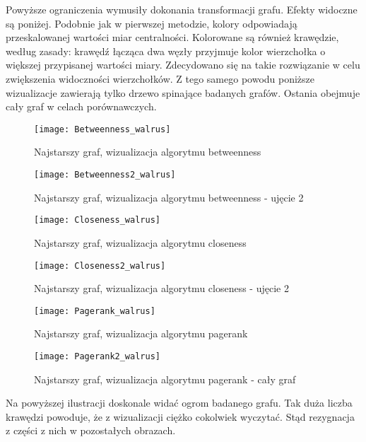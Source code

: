 Powyższe ograniczenia wymusiły dokonania transformacji grafu. Efekty widoczne są poniżej. Podobnie jak w pierwszej metodzie, kolory odpowiadają przeskalowanej wartości miar centralności. Kolorowane są również krawędzie, według zasady: krawędź łącząca dwa węzły przyjmuje kolor wierzchołka o większej przypisanej wartości miary. Zdecydowano się na takie rozwiązanie w celu zwiększenia widoczności wierzchołków. Z tego samego powodu poniższe wizualizacje zawierają tylko drzewo spinające badanych grafów. Ostania obejmuje cały graf w celach porównawczych. 

\FloatBarrier\FloatBarrier
\begin{figure}[h]
	\centering
	\texttt{[image: Betweenness\_walrus]}
	\caption{Najstarszy graf, wizualizacja algorytmu betweenness}
\end{figure}
\FloatBarrier\FloatBarrier
\FloatBarrier\FloatBarrier
\begin{figure}[h]
	\centering
	\texttt{[image: Betweenness2\_walrus]}
	\caption{Najstarszy graf, wizualizacja algorytmu betweenness - ujęcie 2}
\end{figure}
\FloatBarrier\FloatBarrier

\FloatBarrier\FloatBarrier
\begin{figure}[h]
	\centering
	\texttt{[image: Closeness\_walrus]}
	\caption{Najstarszy graf, wizualizacja algorytmu closeness}
\end{figure}
\FloatBarrier\FloatBarrier
\FloatBarrier\FloatBarrier
\begin{figure}[h]
	\centering
	\texttt{[image: Closeness2\_walrus]}
	\caption{Najstarszy graf, wizualizacja algorytmu closeness - ujęcie 2}
\end{figure}
\FloatBarrier\FloatBarrier        
\FloatBarrier\FloatBarrier
\begin{figure}[h]
	\centering
	\texttt{[image: Pagerank\_walrus]}
	\caption{Najstarszy graf, wizualizacja algorytmu pagerank}
\end{figure}
\FloatBarrier\FloatBarrier
\FloatBarrier\FloatBarrier
\begin{figure}[h]
	\centering
	\texttt{[image: Pagerank2\_walrus]}
	\caption{Najstarszy graf, wizualizacja algorytmu pagerank - cały graf}
\end{figure}
  

Na powyższej ilustracji doskonale widać ogrom badanego grafu. Tak duża liczba krawędzi powoduje, że z wizualizacji ciężko cokolwiek wyczytać. Stąd rezygnacja z części z nich w pozostałych obrazach.